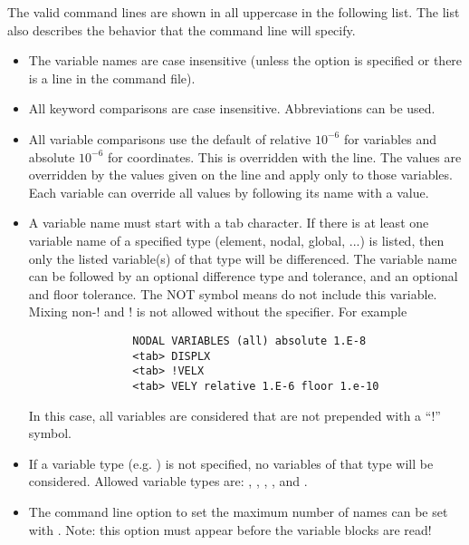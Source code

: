 The valid command lines are shown in all uppercase in the following
list. The list also describes the behavior that the command line will
specify.
\begin{itemize}
\item The variable names are case insensitive (unless the
	 option is specified or there is a
	 line in the command file).

\item All keyword comparisons are case insensitive. Abbreviations can be used.

\item All variable comparisons use the default of relative $10^{-6}$ for
	variables and absolute $10^{-6}$ for coordinates.  This is
	overridden with the  line.  The
	 values are overridden by the values
	given on the  line and apply only to those
	variables.  Each variable can override all values by following
	its name with a value.

\item A variable name must start with a tab character.  If there is at least
	one variable name of a specified type (element, nodal, global,
	...) is listed, then only the listed variable(s) of that type will be differenced.
	The variable name can be followed by an optional difference
	type and tolerance, and an optional  and floor
	tolerance. The NOT symbol \param{!} means do not include this
	variable.  Mixing non-! and ! is not allowed without the
	 specifier.  For example
\begin{verbatim}
                NODAL VARIABLES (all) absolute 1.E-8
                <tab> DISPLX
                <tab> !VELX
                <tab> VELY relative 1.E-6 floor 1.e-10
\end{verbatim}
           In this case, all variables are considered that are not prepended
           with a ``!'' symbol.

\item If a variable type (e.g. ) is not specified, no
	variables of that type will be considered.  Allowed variable
	types are: , ,
	, , and
	.

\item The command line option to set the maximum number of \exo{}
	names can be set with .  Note:  this option must
	appear before the variable blocks are read!


\end{itemize}
